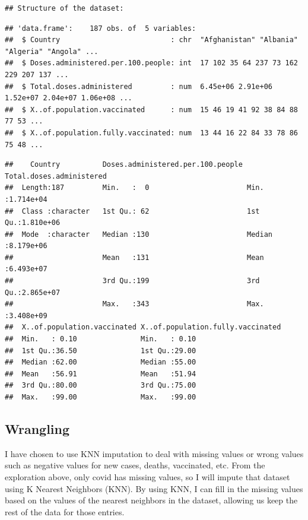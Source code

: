 \documentclass[
]{article}
\begin{document}
\begin{verbatim}
## Structure of the dataset:
\end{verbatim}

\begin{verbatim}
## 'data.frame':    187 obs. of  5 variables:
##  $ Country                          : chr  "Afghanistan" "Albania" "Algeria" "Angola" ...
##  $ Doses.administered.per.100.people: int  17 102 35 64 237 73 162 229 207 137 ...
##  $ Total.doses.administered         : num  6.45e+06 2.91e+06 1.52e+07 2.04e+07 1.06e+08 ...
##  $ X..of.population.vaccinated      : num  15 46 19 41 92 38 84 88 77 53 ...
##  $ X..of.population.fully.vaccinated: num  13 44 16 22 84 33 78 86 75 48 ...
\end{verbatim}

\begin{verbatim}
##    Country          Doses.administered.per.100.people Total.doses.administered
##  Length:187         Min.   :  0                       Min.   :1.714e+04       
##  Class :character   1st Qu.: 62                       1st Qu.:1.810e+06       
##  Mode  :character   Median :130                       Median :8.179e+06       
##                     Mean   :131                       Mean   :6.493e+07       
##                     3rd Qu.:199                       3rd Qu.:2.865e+07       
##                     Max.   :343                       Max.   :3.408e+09       
##  X..of.population.vaccinated X..of.population.fully.vaccinated
##  Min.   : 0.10               Min.   : 0.10                    
##  1st Qu.:36.50               1st Qu.:29.00                    
##  Median :62.00               Median :55.00                    
##  Mean   :56.91               Mean   :51.94                    
##  3rd Qu.:80.00               3rd Qu.:75.00                    
##  Max.   :99.00               Max.   :99.00
\end{verbatim}

\vspace{2cm}

\subsection{Wrangling}\label{wrangling}

I have chosen to use KNN imputation to deal with missing values or wrong
values such as negative values for new cases, deaths, vaccinated, etc.
From the exploration above, only covid has missing values, so I will
impute that dataset using K Nearest Neighbors (KNN). By using KNN, I can
fill in the missing values based on the values of the nearest neighbors
in the dataset, allowing us keep the rest of the data for those entries.
\end{document}
